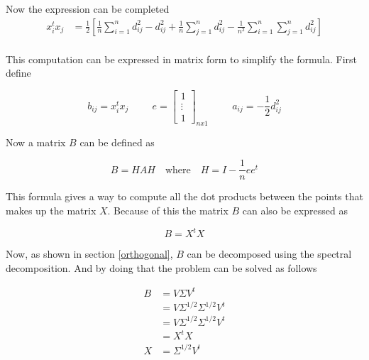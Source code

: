 \documentclass{article}
\begin{document}
    Now the expression can be completed
    \begin{equation*}
        \begin{aligned}
            x_i^t x_j
            &=
            \frac{1}{2} \left[ \frac{1}{n} \sum_{i=1}^n d_{ij}^2 - d_{ij}^2 + \frac{1}{n} \sum_{j=1}^n d_{ij}^2 - \frac{1}{n^2}\sum_{i=1}^n \sum_{j=1}^n d_{ij}^2 \right]\\
        \end{aligned}
    \end{equation*}

    This computation can be expressed in matrix form to simplify the formula.
    First define

    \[
        b_{ij} = x_i^t x_j
        \hspace{1cm}
        e =
        \begin{bmatrix}
            1\\
            \vdots\\
            1
        \end{bmatrix}_{nx1}
        \hspace{1cm}
        a_{ij} = -\frac{1}{2} d_{ij}^2
    \]

    Now a matrix $B$ can be defined as

    \begin{equation*}
        B = H A H \quad \text{where} \quad H = I - \frac{1}{n} e e^t
    \end{equation*}

    This formula gives a way to compute all the dot products between the points
    that makes up the matrix $X$. Because of this the matrix $B$ can also
    be expressed as

    \begin{equation*}
        B = X^tX
    \end{equation*}

    Now, as shown in section \ref{orthogonal}, $B$ can be decomposed using the
    spectral decomposition. And by doing that the problem can be solved as follows

    \begin{equation*}
        \begin{aligned}
            B &= V \Sigma V^t\\
              &= V \Sigma^{1/2} \Sigma^{1/2} V^t\\
              &= V \Sigma^{1/2} \Sigma^{1/2} V^t\\
              &= X^t X\\
            X & = \Sigma^{1/2} V^t
        \end{aligned}
    \end{equation*}
\end{document}
